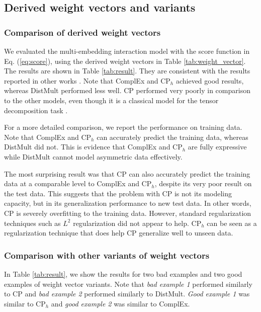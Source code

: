 \documentclass[sigconf,edbt]{acmart-edbt2019}
\begin{document}
\subsection{Derived weight vectors and variants}
\subsubsection{Comparison of derived weight vectors } 
We evaluated the multi-embedding interaction model with the score function in Eq. (\ref{eq:score}), using the derived weight vectors in Table \ref{tab:weight_vector}. The results are shown in Table \ref{tab:result}. They are consistent with the results reported in other works \cite{trouillon_complexembeddingssimple_2016}. Note that ComplEx and CP$ _h $ achieved good results, whereas DistMult performed less well. CP performed very poorly in comparison to the other models, even though it is a classical model for the tensor decomposition task \cite{hitchcock_expressiontensorpolyadic_1927}.

For a more detailed comparison, we report the performance on training data. Note that ComplEx and CP$ _h $ can accurately predict the training data, whereas DistMult did not. This is evidence that ComplEx and CP$ _h $ are fully expressive while DistMult cannot model asymmetric data effectively. 

The most surprising result was that CP can also accurately predict the training data at a comparable level to ComplEx and CP$ _h $, despite its very poor result on the test data. This suggests that the problem with CP is not its modeling capacity, but in its generalization performance to new test data. In other words, CP is severely overfitting to the training data. However, standard regularization techniques such as $ L^2 $ regularization did not appear to help. CP$ _h $ can be seen as a regularization technique that does help CP generalize well to unseen data.

\subsubsection{Comparison with other variants of weight vectors} 
In Table \ref{tab:result}, we show the results for two bad examples and two good examples of weight vector variants. Note that \textit{bad example 1} performed similarly to CP and \textit{bad example 2} performed similarly to DistMult. \textit{Good example 1} was similar to CP$ _h $ and \textit{good example 2} was similar to ComplEx.
\end{document}
